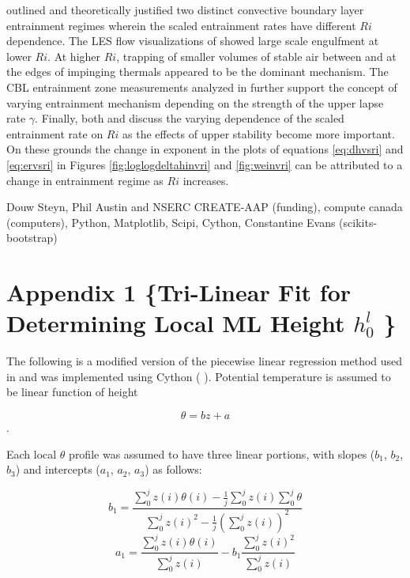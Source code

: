 \cite{Turner86} outlined and theoretically justified two distinct convective boundary layer entrainment regimes wherein the scaled entrainment rates have different $Ri$ dependence. The LES flow visualizations of \cite{SullMoengStev} showed large scale engulfment at lower $Ri$.  At higher $Ri$, trapping of smaller volumes of stable air between and at the edges of impinging thermals appeared to be the dominant mechanism. The CBL entrainment zone measurements analyzed in \cite{Traum11} further support the concept of varying entrainment mechanism depending on the strength of the upper lapse rate $\gamma$.  Finally, both \cite{FedConzMir04} and \cite{GarciaMellado} discuss the varying dependence of the scaled entrainment rate on $Ri$ as the effects of upper stability become more important.  On these grounds the change in exponent in the plots of equations \ref{eq:dhvsri} and \ref{eq:ervsri} in Figures \ref{fig:loglogdeltahinvri} and \ref{fig:weinvri} can be attributed to a change in entrainment regime as $Ri$ increases.   



\begin{acknowledgements}
Douw Steyn, Phil Austin and NSERC CREATE-AAP (funding), compute canada (computers), Python, Matplotlib, Scipi, Cython, Constantine Evans (scikits-bootstrap) 
\end{acknowledgements}

\section*{Appendix 1 \{Tri-Linear Fit for Determining Local ML Height $h^{l}_{0}$ \}}
\label{sec:trilinfit}
The following is a modified version of the piecewise linear regression method used in \cite{Vieth} and was implemented using Cython (\citeauthor{behnel2010} \citeyear{behnel2010}).  Potential temperature is assumed to be linear function of height 

\begin{equation}
\theta = bz + a 
\end{equation}.

Each local $\theta$ profile was assumed to have three linear portions, with slopes ($b_{1}$, $b_{2}$, $b_{3}$) and intercepts ($a_{1}$, $a_{2}$, $a_{3}$) as follows:

\begin{equation}
b_{1} = \frac{\sum^{j}_{0}z(i) \theta (i) - \frac{1}{j}\sum^{j}_{0}z(i)\sum^{j}_{0}\theta}{\sum^{j}_{0}z(i)^{2} - \frac{1}{j}(\sum^{j}_{0}z(i))^{2}}
\end{equation}
\begin{equation}
a_{1} = \frac{\sum^{j}_{0}z(i)\theta(i)}{\sum^{j}_{0}z(i)} - b_{1}\frac{\sum^{j}_{0}z(i)^{2}}{\sum^{j}_{0}z(i)}
\end{equation}

